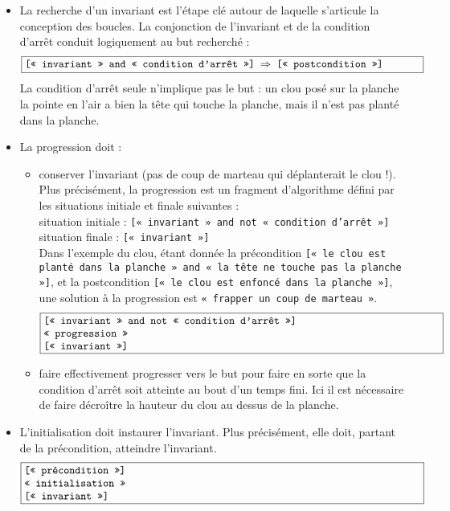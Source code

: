 \begin{itemize}
\item La recherche d'un invariant est l'étape clé autour de laquelle s'articule la conception des boucles. 
	La conjonction de l'invariant et de la condition d'arrêt conduit logiquement au but recherché :
	$$\fbox{\begin{minipage}{13cm}\tt
	[« invariant » and « condition d'arrêt »] $\Rightarrow$ [« postcondition »]
	\end{minipage}}$$
	La condition d'arrêt seule n'implique pas le but : un clou posé sur la
	planche la pointe en l'air a bien la tête qui touche la planche, mais il n'est pas
	planté dans la planche.
\item La progression doit :
	\begin{itemize}
	\item conserver l'invariant (pas de coup de marteau qui déplanterait le clou !).
		Plus précisément, la progression est un fragment d'algorithme
		défini par les situations initiale et finale suivantes :\\
		\mbox{}\hspace*{5mm}situation initiale : {\tt [« invariant » and not « condition d'arrêt »]}\\
		\mbox{}\hspace*{5mm}situation finale : {\tt [« invariant »]}\\ 
		Dans l'exemple du clou, étant donnée la précondition {\tt [« le clou est planté dans la
		planche » and « la tête ne touche pas la planche »]}, et la postcondition {\tt [« le
		clou est enfoncé dans la planche »]}, une solution à la progression est {\tt « frap\-per
		un coup de marteau »}. 
		$$\fbox{\begin{minipage}{13cm}\tt
		\mbox{}[« invariant » and not « condition d'arrêt »]\\
		\mbox{}« progression »\\
		\mbox{}[« invariant »]
		\end{minipage}}$$
	\item faire effectivement progresser vers le but pour faire en sorte que la condition 
		d'arrêt soit atteinte au bout d'un temps fini. Ici il est nécessaire de
		faire décroître la hauteur du clou au dessus de la planche. 
	\end{itemize}
\item  L'initialisation doit instaurer l'invariant. 
	Plus précisément, elle doit, partant de la précondi\-tion, atteindre l'invariant.
		$$\fbox{\begin{minipage}{13cm}\tt
		\mbox{}[« précondition »]\\
		\mbox{}« initialisation »\\
		\mbox{}[« invariant »]
		\end{minipage}}$$

\end{itemize}
